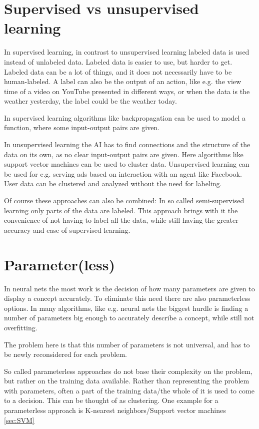 \section{Supervised vs unsupervised learning}
In supervised learning, in contrast to unsupervised learning labeled data is used instead of unlabeled data. 
Labeled data is easier to use, but harder to get. Labeled data can be a lot of things, and it does not necessarily have to be human-labeled. A label can also be the output of an action, like e.g. the view time of a video on YouTube presented in different ways, or when the data is the weather yesterday, the label could be the weather today.

In supervised learning algorithms like backpropagation can be used to model a function, where some input-output pairs are given.

In unsupervised learning the AI has to find connections and the structure of the data on its own, as no clear input-output pairs are given.
Here algorithms like support vector machines can be used to cluster data. Unsupervised learning can be used for e.g. serving ads based on interaction with an agent like Facebook. User data can be clustered and analyzed without the need for labeling.

Of course these approaches can also be combined: In so called semi-supervised learning only parts of the data are labeled. This approach brings with it the convenience of not having to label all the data, while still having the greater accuracy and ease of supervised learning.

\section{Parameter(less)}
In neural nets the most work is the decision of how many parameters are given to display a concept accurately. To eliminate this need there are also parameterless options. 
In many algorithms, like e.g. neural nets the biggest hurdle is finding a number of parameters big enough to accurately describe a concept, while still not overfitting.

The problem here is that this number of parameters is not universal, and has to be newly reconsidered for each problem.

So called parameterless approaches do not base their complexity on the problem, but rather on the training data available. Rather than representing the problem with parameters, often a part of the training data/the whole of it is used to come to a decision. This can be thought of as clustering.
One example for a parameterless approach is K-nearest neighbors/Support vector machines %
\autoref{sec:SVM}

